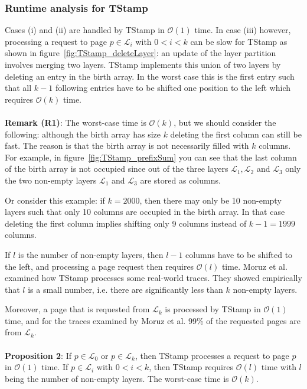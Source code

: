 \documentclass[a4paper,12pt, titlepage]{article}  %
\newcommand{\cl}{\mathcal{L}}   %
\newcommand{\oh}{\mathcal{O}}   %
\begin{document}
\subsubsection{Runtime analysis for TStamp}
\label{sec:runtimeAnalysisTStamp}
Cases (i) and (ii) are handled by TStamp in $\oh(1)$ time. 
In case (iii) however, processing a request to page $p \in \cl_i$ with $0<i<k$ can be slow for TStamp as shown in figure~\ref{fig:TStamp_deleteLayer}:
an update of the layer partition involves merging two layers.   
TStamp implements this union of two layers by deleting an entry in the birth array. In the worst case 
this is the first entry such that all $k-1$ following entries have to be shifted one position to 
the left which requires $\oh(k)$ time.\\
\\
\noindent \textbf{Remark (R1)}: The worst-case time is $\oh(k)$, but we should consider the following:
although the birth array has size $k$ deleting the first column can still be fast. The reason 
is that the birth array is not necessarily filled with $k$ columns. For example, in figure~\ref{fig:TStamp_prefixSum}
you can see that the last column of the birth array is not occupied since out of the three layers $\cl_1, \cl_2$ and $\cl_3$ 
only the two non-empty layers $\cl_1$ and $\cl_3$ are stored as columns.  

Or consider this example: if $k=2000$, then there may only be 10 non-empty layers such 
that only 10 columns are occupied in the birth array. In that case deleting the first column implies
shifting only 9 columns instead of $k-1=1999$ columns. 

If $l$ is the number of non-empty layers, then $l-1$ columns have to be shifted to the left, 
and processing a page request then requires $\oh(l)$ time. 
Moruz et al.~\cite{sea12_paper} examined how TStamp processes some real-world traces. 
They showed empirically that $l$ is a small number, i.e. there are significantly less than $k$ non-empty layers. 

Moreover, a page that is requested from $\cl_k$ is processed by TStamp in $\oh(1)$ time, and 
for the traces examined by Moruz et al.  99\% of the requested pages are from $\cl_k$.\\
\\
\noindent \textbf{Proposition 2}: If $p \in \cl_0$ or $p \in \cl_k$, then TStamp processes a request to page $p$ in $\oh(1)$ time. 
If $p \in \cl_i$ with $0<i<k$, then TStamp requires $\oh(l)$ time with $l$ being the number of non-empty layers. 
The worst-case time is $\oh(k)$.
\end{document}
